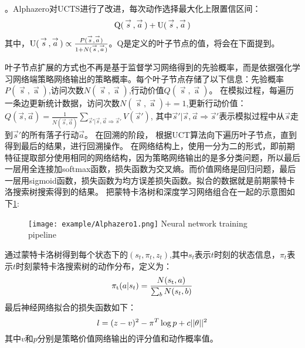 。Alphazero对UCTS进行了改进，每次动作选择最大化上限置信区间：
\begin{equation}
{\rm{Q(}}\mathop s\limits^ \to  {\rm{,}}\mathop a\limits^ \to  {\rm{) + U(}}\mathop s\limits^ \to  {\rm{,}}\mathop a\limits^ \to  {\rm{)}}
\end{equation}
其中，${\rm{U(}}\mathop s\limits^ \to  {\rm{,}}\mathop a\limits^ \to  {\rm{)}} \propto \frac{{P(\mathop s\limits^ \to  ,\mathop a\limits^ \to  )}}{{1 + N(\mathop s\limits^ \to  ,\mathop a\limits^ \to  )}}$。Q是定义的叶子节点的值，将会在下面提到。

叶子节点扩展的方式也不再是基于监督学习网络得到的先验概率，而是依据强化学习网络端策略网络输出的策略概率。每个叶子节点存储了以下信息：先验概率$P(\mathop s\limits^ \to  ,\mathop a\limits^ \to  )$,访问次数$N(\mathop s\limits^ \to  ,\mathop a\limits^ \to  )$,行动价值$Q(\mathop s\limits^ \to  ,\mathop a\limits^ \to  )$。
在模拟过程，每遍历一条边更新统计数据，访问次数${N(\mathop s\limits^ \to  ,\mathop a\limits^ \to  )} +=1$,更新行动价值：$Q(\vec{s},\vec{a})=\frac{1}{N(\vec{s},\vec{a})}\sum_{\vec{s}'\vert \vec{s},\vec{a}\Rightarrow \vec{s}'}V(\vec{s}')$, 其中$\vec{s}'\vert \vec{s},\vec{a} \Rightarrow \vec{s}'$表示模拟过程中从$\vec{s}$走到$\vec{s}'$的所有落子行动$\vec{a}$。
在回溯的阶段，
根据UCT算法向下遍历叶子节点，直到得到最后的结果，进行回溯操作。
在网络结构上，使用一分为二的形式，即前期特征提取部分使用相同的网络结构，因为策略网络输出的是多分类问题，所以最后一层用全连接加softmax函数，损失函数为交叉熵。而价值网络是回归问题，最后一层用sigmoid函数，损失函数为均方误差损失函数。拟合的数据就是前期蒙特卡洛搜索树搜索得到的结果。
把蒙特卡洛树和深度学习网络组合在一起的示意图如下\ref{fig:Alphazero1}:

\begin{figure}[!htp]
	\centering
	\texttt{[image: example/Alphazero1.png]}
	{Neural network training pipeline}
	\label{fig:Alphazero1}
\end{figure}
通过蒙特卡洛树得到每个状态下的$({s_t},{\pi _t},{z_t})$,其中$s_t$表示$t$时刻的状态信息，$\pi_t$表示$t$时刻蒙特卡洛搜索树的动作分布，定义为：
\begin{equation}
\label{eq:fenbu}
{\pi _{\rm{t}}}(a|{s_t}) = \frac{{N({s_{\rm{t}}},a)}}{{\sum\nolimits_b {N({s_t},b)} }}
\end{equation}
最后神经网络拟合的损失函数如下：
\begin{equation}
l = {(z - v)^2} - {\pi ^T}\log p + c{\rm{||}}\theta {\rm{|}}{{\rm{|}}^2}
\end{equation}
其中$v$和$p$分别是策略价值网络输出的评分值和动作概率值。
